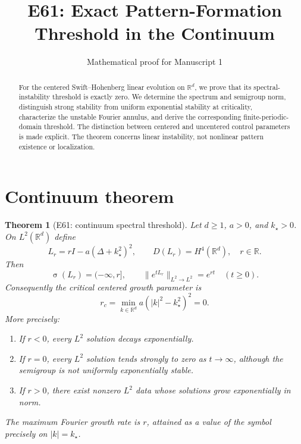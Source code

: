 \documentclass[11pt]{article}
\title{E61: Exact Pattern-Formation Threshold in the Continuum}
\author{Mathematical proof for Manuscript 1}
\date{}
\newtheorem{theorem}{Theorem}
\DeclareMathOperator{\spec}{\sigma}
\newcommand{\R}{\mathbb{R}}
\begin{document}
\maketitle

\begin{abstract}
For the centered Swift--Hohenberg linear evolution on $\R^d$, we prove that
its spectral-instability threshold is exactly zero. We determine the
spectrum and semigroup norm, distinguish strong stability from uniform
exponential stability at criticality, characterize the unstable Fourier
annulus, and derive the corresponding finite-periodic-domain threshold.
The distinction between centered and uncentered control parameters is made
explicit. The theorem concerns linear instability, not nonlinear pattern
existence or localization.
\end{abstract}

\section{Continuum theorem}

\begin{theorem}[E61: continuum spectral threshold]\label{thm:E61}
Let $d\ge 1$, $a>0$, and $k_\star>0$. On $L^2(\R^d)$ define
\begin{equation}\label{eq:operator}
L_r = rI-a(\Delta+k_\star^2)^2,
\qquad D(L_r)=H^4(\R^d), \quad r\in\R.
\end{equation}
Then
\begin{equation}\label{eq:spectrum}
\spec(L_r)=(-\infty,r], \qquad
\|e^{tL_r}\|_{L^2\to L^2}=e^{rt}\quad (t\ge0).
\end{equation}
Consequently the critical centered growth parameter is
\begin{equation}\label{eq:threshold}
\boxed{\displaystyle
r_c=\min_{k\in\R^d}a(|k|^2-k_\star^2)^2=0.}
\end{equation}
More precisely:
\begin{enumerate}
\item If $r<0$, every $L^2$ solution decays exponentially.
\item If $r=0$, every $L^2$ solution tends strongly to zero as $t\to\infty$,
      although the semigroup is not uniformly exponentially stable.
\item If $r>0$, there exist nonzero $L^2$ data whose solutions grow
      exponentially in norm.
\end{enumerate}
The maximum Fourier growth rate is $r$, attained as a value of the
symbol precisely on $|k|=k_\star$.
\end{theorem}
\end{document}
